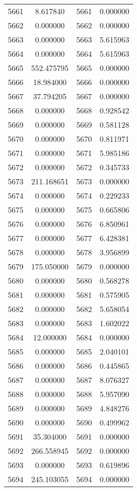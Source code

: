\documentclass[12pt]{article}
\begin{document}
\begin{longtable}{@{}cccc@{}}
5661 & 8.617840 & 5661 & 0.000000 \\
5662 & 0.000000 & 5662 & 0.000000 \\
5663 & 0.000000 & 5663 & 5.615963 \\
5664 & 0.000000 & 5664 & 5.615963 \\
5665 & 552.475795 & 5665 & 0.000000 \\
5666 & 18.984000 & 5666 & 0.000000 \\
5667 & 37.794205 & 5667 & 0.000000 \\
5668 & 0.000000 & 5668 & 0.928542 \\
5669 & 0.000000 & 5669 & 0.581128 \\
5670 & 0.000000 & 5670 & 0.811971 \\
5671 & 0.000000 & 5671 & 5.985186 \\
5672 & 0.000000 & 5672 & 0.345733 \\
5673 & 211.168651 & 5673 & 0.000000 \\
5674 & 0.000000 & 5674 & 0.229233 \\
5675 & 0.000000 & 5675 & 0.665806 \\
5676 & 0.000000 & 5676 & 6.850961 \\
5677 & 0.000000 & 5677 & 6.428381 \\
5678 & 0.000000 & 5678 & 3.956899 \\
5679 & 175.050000 & 5679 & 0.000000 \\
5680 & 0.000000 & 5680 & 0.568278 \\
5681 & 0.000000 & 5681 & 0.575905 \\
5682 & 0.000000 & 5682 & 5.658054 \\
5683 & 0.000000 & 5683 & 1.602022 \\
5684 & 12.000000 & 5684 & 0.000000 \\
5685 & 0.000000 & 5685 & 2.040101 \\
5686 & 0.000000 & 5686 & 0.445865 \\
5687 & 0.000000 & 5687 & 8.076327 \\
5688 & 0.000000 & 5688 & 5.957090 \\
5689 & 0.000000 & 5689 & 4.848276 \\
5690 & 0.000000 & 5690 & 0.499962 \\
5691 & 35.304000 & 5691 & 0.000000 \\
5692 & 266.558945 & 5692 & 0.000000 \\
5693 & 0.000000 & 5693 & 0.619896 \\
5694 & 245.103055 & 5694 & 0.000000 \\

\end{longtable}
\end{document}
